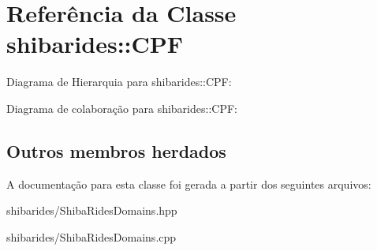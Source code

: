 \hypertarget{classshibarides_1_1CPF}{}\section{Referência da Classe shibarides\+:\+:C\+PF}
\label{classshibarides_1_1CPF}


Diagrama de Hierarquia para shibarides\+:\+:C\+PF\+:


Diagrama de colaboração para shibarides\+:\+:C\+PF\+:
\subsection*{Outros membros herdados}


A documentação para esta classe foi gerada a partir dos seguintes arquivos\+:\begin{DoxyCompactItemize}
\item 
shibarides/Shiba\+Rides\+Domains.\+hpp\item 
shibarides/Shiba\+Rides\+Domains.\+cpp\end{DoxyCompactItemize}
